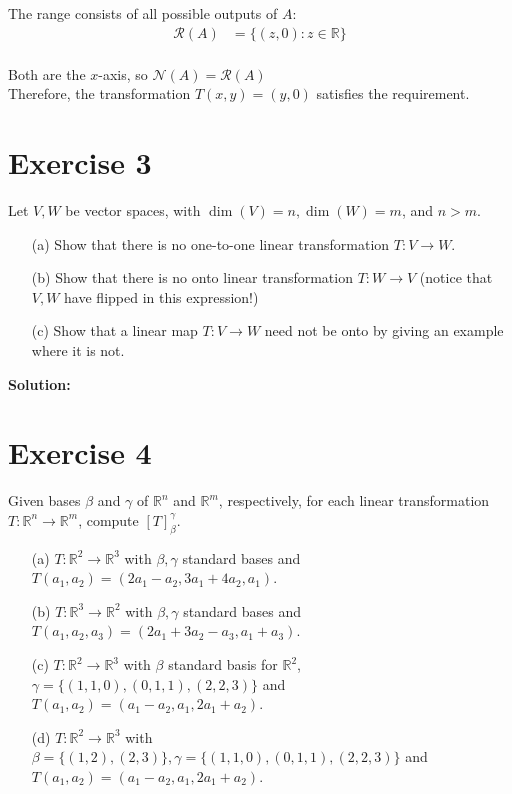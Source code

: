 \documentclass{article}
\begin{document}
The range consists of all possible outputs of $A$:
\begin{align*}
\mathcal{R}(A) &= \{(z,0) : z \in \mathbb{R}\}\\
\end{align*}

Both are the $x$-axis, so $\mathcal{N}(A) = \mathcal{R}(A)$ \\

Therefore, the transformation $T(x,y) = (y,0)$ satisfies the requirement.

\newpage

\section*{Exercise 3}
Let $V,W$ be vector spaces, with $\dim(V) = n, \dim(W) = m$, and $n > m$.

\begin{itemize}
    \item[(a)] Show that there is no one-to-one linear transformation $T : V \to W$.

    \item[(b)] Show that there is no onto linear transformation $T : W \to V$ (notice that $V,W$ have flipped in this expression!)

    \item[(c)] Show that a linear map $T : V \to W$ need not be onto by giving an example where it is not.
\end{itemize}

\textbf{Solution: }\\



\newpage

\section*{Exercise 4}
Given bases $\beta$ and $\gamma$ of $\mathbb{R}^n$ and $\mathbb{R}^m$, respectively, for each linear transformation $T : \mathbb{R}^n \to \mathbb{R}^m$, compute $[T]_{\beta}^{\gamma}$.

\begin{itemize}
    \item[(a)] $T : \mathbb{R}^2 \to \mathbb{R}^3$ with $\beta, \gamma$ standard bases and $T(a_1, a_2) = (2a_1 - a_2, 3a_1 + 4a_2, a_1)$.

    \item[(b)] $T : \mathbb{R}^3 \to \mathbb{R}^2$ with $\beta, \gamma$ standard bases and $T(a_1, a_2, a_3) = (2a_1 + 3a_2 - a_3, a_1 + a_3)$.

    \item[(c)] $T : \mathbb{R}^2 \to \mathbb{R}^3$ with $\beta$ standard basis for $\mathbb{R}^2$, $\gamma = \{(1,1,0),(0,1,1),(2,2,3)\}$ and $T(a_1, a_2) = (a_1 - a_2, a_1, 2a_1 + a_2)$.

    \item[(d)] $T : \mathbb{R}^2 \to \mathbb{R}^3$ with $\beta = \{(1,2),(2,3)\}, \gamma = \{(1,1,0),(0,1,1),(2,2,3)\}$ and $T(a_1, a_2) = (a_1 - a_2, a_1, 2a_1 + a_2)$.
\end{itemize}
\end{document}
